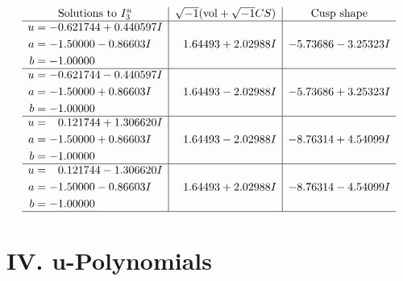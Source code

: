 \documentclass[1p]{elsarticle_modified}
\theoremstyle{definition}
\newcommand{\I}{\sqrt{-1}}
\begin{document}
$$\begin{array}{c|c|c}  
\text{Solutions to }I^u_{3}& \I (\text{vol} + \sqrt{-1}CS) & \text{Cusp shape}\\
 \hline 
\begin{aligned}
u &= -0.621744 + 0.440597 I \\
a &= -1.50000 - 0.86603 I \\
b &= -1.00000\phantom{ +0.000000I}\end{aligned}
 & \phantom{-}1.64493 + 2.02988 I & -5.73686 - 3.25323 I \\ \hline\begin{aligned}
u &= -0.621744 - 0.440597 I \\
a &= -1.50000 + 0.86603 I \\
b &= -1.00000\phantom{ +0.000000I}\end{aligned}
 & \phantom{-}1.64493 - 2.02988 I & -5.73686 + 3.25323 I \\ \hline\begin{aligned}
u &= \phantom{-}0.121744 + 1.306620 I \\
a &= -1.50000 + 0.86603 I \\
b &= -1.00000\phantom{ +0.000000I}\end{aligned}
 & \phantom{-}1.64493 - 2.02988 I & -8.76314 + 4.54099 I \\ \hline\begin{aligned}
u &= \phantom{-}0.121744 - 1.306620 I \\
a &= -1.50000 - 0.86603 I \\
b &= -1.00000\phantom{ +0.000000I}\end{aligned}
 & \phantom{-}1.64493 + 2.02988 I & -8.76314 - 4.54099 I\\
 \hline 
 \end{array}$$\newpage
\newpage\renewcommand{\arraystretch}{1}
\centering \section*{ IV. u-Polynomials}
\end{document}

